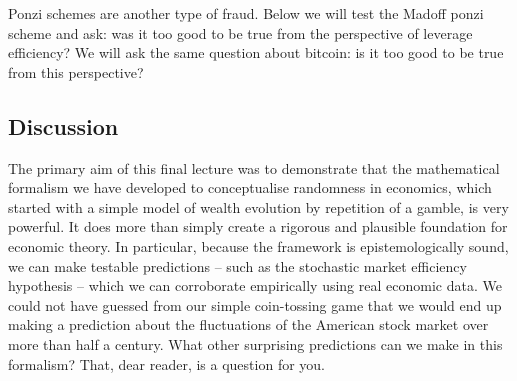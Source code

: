 Ponzi schemes are another type of fraud. Below we will test the Madoff ponzi scheme and ask: was it too good to be true from the perspective of leverage efficiency? We will ask the same question about bitcoin: is it too good to be true from this perspective?


\subsection{Discussion}
The primary aim of this final lecture was to demonstrate that the mathematical formalism we have developed to conceptualise randomness in economics, which started with a simple model of wealth evolution by repetition of a gamble, is very powerful. It does more than simply create a rigorous and plausible foundation for economic theory. In particular, because the framework is epistemologically sound, we can make testable predictions -- such as the stochastic market efficiency hypothesis -- which we can corroborate empirically using real economic data. We could not have guessed from our simple coin-tossing game that we would end up making a prediction about the fluctuations of the American stock market over more than half a century. What other surprising predictions can we make in this formalism? That, dear reader, is a question for you.

